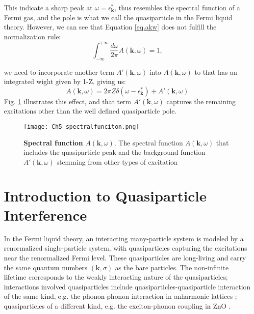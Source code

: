 This indicate a sharp peak at $\omega=\epsilon^*_\textbf{k}$, thus resembles the spectral function of a Fermi gas, and the pole is what we call the quasiparticle in the Fermi liquid theory. However, we can see that Equation \ref{eq.akw} does not fulfill the normalization rule: 
\begin{equation}
	\int_{-\infty}^{+\infty} \frac{d\omega}{2\pi} A(\textbf{k},\omega) = 1, 
\end{equation}

we need to incorporate another term $A'(\textbf{k},\omega)$ into $ A(\textbf{k},\omega)$ to that has an integrated wight given by 1-Z, giving us: 
\begin{equation}
	\label{eq.akw}
	A(\textbf{k},\omega) = 2\pi Z\delta(\omega-\epsilon^*_\textbf{k}) + A'(\textbf{k},\omega)
\end{equation}
Fig. \ref{fig:ch5_spect} \cite{bruusManyBodyQuantum2004} illustrates this effect, and that term $A'(\textbf{k},\omega)$ captures the remaining excitations other than the well defined quasiparticle pole. 

\begin{figure}
	\centering
	\texttt{[image: Ch5\_spectralfunciton.png]}
	\caption[\textbf{Spectral function $A(\textbf{k},\omega)$}]{\textbf{Spectral function $A(\textbf{k},\omega)$}. The spectral function $A(\textbf{k},\omega)$ that includes the quasiparticle peak and the background function $A'(\textbf{k},\omega)$ stemming from other types of excitation}
	\label{fig:ch5_spect}
\end{figure}

\section{Introduction to Quasiparticle Interference}

In the Fermi liquid theory, an interacting many-particle system is modeled by a renormalized single-particle system, with quasiparticles capturing the excitations near the renormalized Fermi level. These quasiparticles are long-living and carry the same quantum numbers $(\textbf{k}, \sigma)$ as the bare particles. The non-infinite lifetime corresponds to the weakly interacting nature of the quasiparticles; interactions involved quasiparticles include quasiparticles-quasiparticle interaction of the same kind, e.g. the phonon-phonon interaction in anharmonic lattices \cite{kimExploringAnharmonicLattice2023}; quasiparticles of a different kind, e.g. the exciton-phonon coupling in ZnO \cite{mendelsbergPhotoluminescenceExcitonphononCoupling2011}. 

